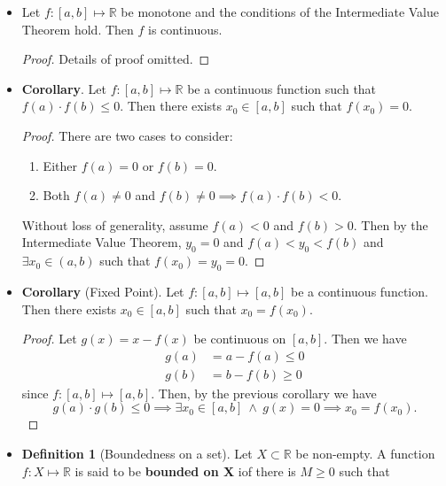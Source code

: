 \documentclass{article}
\newcommand{\R}{\mathbb{R}}
\newcommand{\?}{\stackrel{?}{=}}
\theoremstyle{definition} %
\newtheorem{definition}[theorem]{Definition} %
\begin{document}
\begin{itemize}
\begin{definition}[Monotone functions]
          \end{definition}
    \item[]
          \begin{lemma}
              Let $f: [a, b] \mapsto \R$ be monotone and the conditions of the Intermediate Value Theorem hold. Then $f$ is continuous.
          \end{lemma}
          \begin{proof}
              Details of proof omitted.
          \end{proof}
    \item \textbf{Corollary}. Let $f: [a, b] \mapsto \R$ be a continuous function such that $f(a) \cdot f(b) \leq 0$. Then there exists $x_0 \in [a, b]$ such that $f(x_0) = 0$.
          \begin{proof}
              There are two cases to consider:
              \begin{enumerate}[label=(\arabic*)]
                  \item Either $f(a) = 0$ or $f(b) = 0$.
                  \item Both $f(a) \neq 0$ and $f(b) \neq 0 \implies f(a) \cdot f(b) < 0$.
              \end{enumerate}
              Without loss of generality, assume $f(a) < 0$ and $f(b) > 0$. Then by the Intermediate Value Theorem, $y_0 = 0$ and $f(a) < y_0 < f(b)$ and $\exists x_0 \in (a, b)$ such that $f(x_0) = y_0 = 0$.
          \end{proof}
    \item \textbf{Corollary} (Fixed Point). Let $f: [a, b] \mapsto [a, b]$ be a continuous function. Then there exists $x_0 \in [a, b]$ such that $x_0 = f(x_0)$.
          \begin{proof}
              Let $g(x) = x - f(x)$ be continuous on $[a, b]$. Then we have
              \begin{align*}
                  g(a) & = a - f(a) \leq 0 \\
                  g(b) & = b - f(b) \geq 0
              \end{align*}
              since $f: [a, b] \mapsto [a, b]$. Then, by the previous corollary we have
              $$g(a) \cdot g(b) \leq 0 \implies \exists x_0 \in [a, b] \ \land \ g(x) = 0 \implies x_0 = f(x_0).$$
          \end{proof}
    \item[]
          \begin{definition}[Boundedness on a set]
              Let $X \subset \R$ be non-empty. A function $f: X \mapsto \R$ is said to be \textbf{bounded on X} iof there is $M \geq 0$ such that

\end{definition}
\end{itemize}
\end{document}
